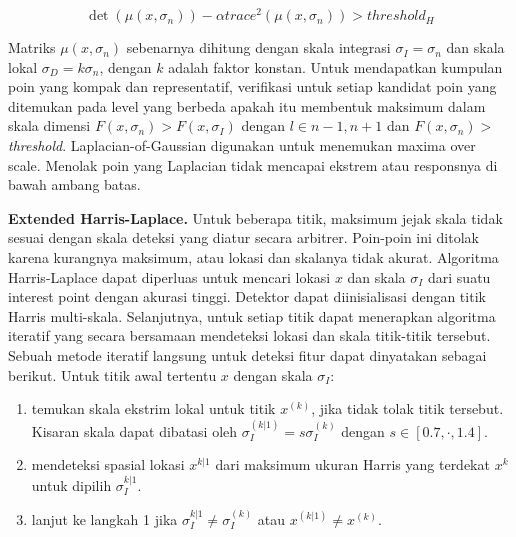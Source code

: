 \begin{equation}
  \det(\mu(x,\sigma_{n}))-\alpha trace^{2}(\mu(x,\sigma_{n})) > threshold_{H}
\end{equation}

Matriks \(\mu(x,\sigma_{n})\) sebenarnya dihitung dengan skala integrasi \(\sigma_{I} = \sigma_{n}\) dan skala lokal \(\sigma_{D} = k \sigma_{n}\), dengan \(k\) adalah faktor konstan. Untuk mendapatkan kumpulan poin yang kompak dan representatif, verifikasi untuk setiap kandidat poin yang ditemukan pada level yang berbeda apakah itu membentuk maksimum dalam skala dimensi \(F(x,\sigma_{n}) > F(x,\sigma_{I})\) dengan \(l \in  {n-1,n+1}\) dan \(F(x,\sigma_{n}) >\) \emph{threshold}. Laplacian-of-Gaussian digunakan untuk menemukan maxima over scale. Menolak poin yang Laplacian tidak mencapai ekstrem atau responsnya di bawah ambang batas.



\textbf{Extended Harris-Laplace.} Untuk beberapa titik, maksimum jejak skala tidak sesuai dengan skala deteksi yang diatur secara arbitrer. Poin-poin ini ditolak karena kurangnya maksimum, atau lokasi dan skalanya tidak akurat. Algoritma Harris-Laplace dapat diperluas untuk mencari lokasi \(x\) dan skala \(\sigma_{I}\) dari suatu interest point dengan akurasi tinggi. Detektor dapat diinisialisasi dengan titik Harris multi-skala. Selanjutnya, untuk setiap titik dapat menerapkan algoritma iteratif yang secara bersamaan mendeteksi lokasi dan skala titik-titik tersebut. Sebuah metode iteratif langsung untuk deteksi fitur dapat dinyatakan sebagai berikut. Untuk titik awal tertentu \(x\) dengan skala \(\sigma_{I}\):

\begin{enumerate}
	\item temukan skala ekstrim lokal untuk titik \(x^{(k)}\), jika tidak tolak titik tersebut. Kisaran skala dapat dibatasi oleh \(\sigma^{(k|1)}_{I} = s\sigma_{I}^{(k)}\) dengan \(s \in [0.7 , \cdot , 1.4]\).
	\item mendeteksi spasial lokasi \(x^{k|1}\) dari maksimum ukuran Harris yang terdekat \(x^{k}\) untuk dipilih \(\sigma^{k|1}_{I}\).
	\item lanjut ke langkah 1 jika \(\sigma^{k|1}_{I} \neq \sigma^{(k)}_{I}\) atau \(x^{(k|1)} \neq x^{(k)}\).
\end{enumerate}

